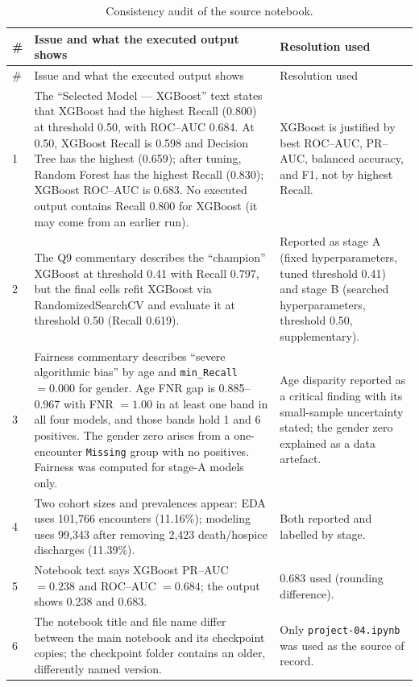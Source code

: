\documentclass[10pt,a4paper]{article}
\begin{document}
{\small
\begin{longtable}{p{0.5cm}p{8.3cm}p{6.4cm}}
\caption{Consistency audit of the source notebook.}\label{tab:audit2}\\
\toprule
\# & Issue and what the executed output shows & Resolution used\\
\midrule
\endfirsthead
\toprule
\# & Issue and what the executed output shows & Resolution used\\
\midrule
\endhead
1 & The ``Selected Model --- XGBoost'' text states that XGBoost had the highest Recall (0.800) at threshold 0.50, with ROC--AUC 0.684. At 0.50, XGBoost Recall is 0.598 and Decision Tree has the highest (0.659); after tuning, Random Forest has the highest Recall (0.830); XGBoost ROC--AUC is 0.683. No executed output contains Recall 0.800 for XGBoost (it may come from an earlier run). & XGBoost is justified by best ROC--AUC, PR--AUC, balanced accuracy, and F1, not by highest Recall.\\
2 & The Q9 commentary describes the ``champion'' XGBoost at threshold 0.41 with Recall 0.797, but the final cells refit XGBoost via RandomizedSearchCV and evaluate it at threshold 0.50 (Recall 0.619). & Reported as stage A (fixed hyperparameters, tuned threshold 0.41) and stage B (searched hyperparameters, threshold 0.50, supplementary).\\
3 & Fairness commentary describes ``severe algorithmic bias'' by age and \texttt{min\_Recall}\,$=0.000$ for gender. Age FNR gap is 0.885--0.967 with FNR $=1.00$ in at least one band in all four models, and those bands hold 1 and 6 positives. The gender zero arises from a one-encounter \texttt{Missing} group with no positives. Fairness was computed for stage-A models only. & Age disparity reported as a critical finding with its small-sample uncertainty stated; the gender zero explained as a data artefact.\\
4 & Two cohort sizes and prevalences appear: EDA uses 101,766 encounters (11.16\%); modeling uses 99,343 after removing 2,423 death/hospice discharges (11.39\%). & Both reported and labelled by stage.\\
5 & Notebook text says XGBoost PR--AUC $=0.238$ and ROC--AUC $=0.684$; the output shows 0.238 and 0.683. & 0.683 used (rounding difference).\\
6 & The notebook title and file name differ between the main notebook and its checkpoint copies; the checkpoint folder contains an older, differently named version. & Only \texttt{project-04.ipynb} was used as the source of record.\\
\bottomrule
\end{longtable}
}
\end{document}
